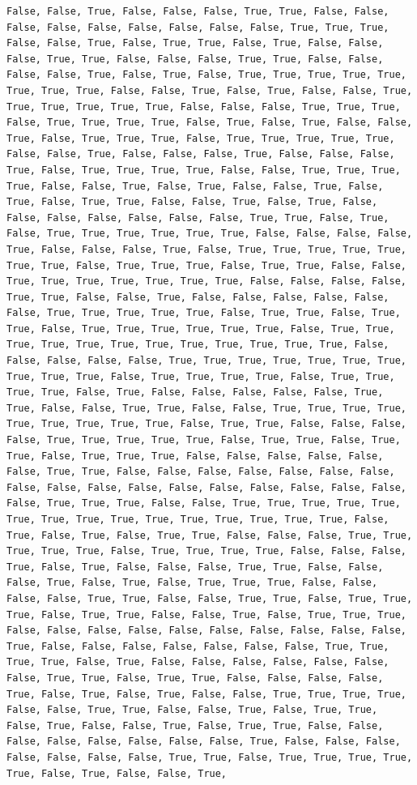 \documentclass[
  letterpaper,
  DIV=11,
  numbers=noendperiod]{scrartcl}
\begin{document}
\begin{verbatim}
False, False, True, False, False, False, True, True, False, False, False, False, False, False, False, False, False, True, True, True, False, False, True, False, True, True, False, True, False, False, False, True, True, False, False, False, True, True, False, False, False, False, True, False, True, False, True, True, True, True, True, True, True, True, False, False, True, False, True, False, False, True, True, True, True, True, True, False, False, False, True, True, True, False, True, True, True, True, False, True, False, True, False, False, True, False, True, True, True, False, True, True, True, True, True, False, False, True, False, False, False, True, False, False, False, True, False, True, True, True, True, False, False, True, True, True, True, False, False, True, False, True, False, False, True, False, True, False, True, True, False, False, True, False, True, False, False, False, False, False, False, False, True, True, False, True, False, True, True, True, True, True, True, False, False, False, False, True, False, False, False, True, False, True, True, True, True, True, True, True, False, True, True, True, False, True, True, False, False, True, True, True, True, True, True, True, False, False, False, False, True, True, False, False, True, False, False, False, False, False, False, True, True, True, True, True, False, True, True, False, True, True, False, True, True, True, True, True, True, False, True, True, True, True, True, True, True, True, True, True, True, True, False, False, False, False, False, True, True, True, True, True, True, True, True, True, True, False, True, True, True, True, False, True, True, True, True, False, True, False, False, False, False, False, True, True, False, False, True, True, False, False, True, True, True, True, True, True, True, True, True, False, True, True, False, False, False, False, True, True, True, True, True, False, True, True, False, True, True, False, True, True, True, False, False, False, False, False, False, True, True, False, False, False, False, False, False, False, False, False, False, False, False, False, False, False, False, False, False, True, True, True, False, False, True, True, True, True, True, True, True, True, True, True, True, True, True, True, True, False, True, False, True, False, True, True, False, False, False, True, True, True, True, True, False, True, True, True, True, False, False, False, True, False, True, False, False, False, True, True, False, False, False, True, False, True, False, True, True, True, False, False, False, False, True, True, False, False, True, True, False, True, True, True, False, True, True, False, False, True, False, True, True, True, False, False, False, False, False, False, False, False, False, False, True, False, False, False, False, False, False, False, True, True, True, True, False, True, False, False, False, False, False, False, False, True, True, False, True, True, False, False, False, False, True, False, True, False, True, False, False, True, True, True, True, False, False, True, True, False, False, True, False, True, True, False, True, False, False, True, False, True, True, False, False, False, False, False, False, False, False, True, False, False, False, False, False, False, False, True, True, False, True, True, True, True, True, False, True, False, False, True, 
\end{verbatim}
\end{document}
